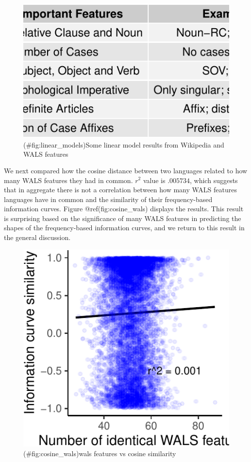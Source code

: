 \documentclass[man,floatsintext]{apa6}
\begin{document}
\begin{figure}
\centering
\includegraphics{figs/linear_models-1.pdf}
\caption{(\#fig:linear\_models)Some linear model results from Wikipedia and WALS features}
\end{figure}

We next compared how the cosine distance between two languages related to how many WALS features they had in common. \(r^2\) value is \(.005734\), which suggests that in aggregate there is not a correlation between how many WALS features languages have in common and the similarity of their frequency-based information curves. Figure @ref(fig:cosine\_wals) displays the results. This result is surprising based on the significance of many WALS features in predicting the shapes of the frequency-based information curves, and we return to this result in the general discussion.

\begin{figure}
\centering
\includegraphics{figs/cosine_wals-1.pdf}
\caption{(\#fig:cosine\_wals)wals features vs cosine similarity}
\end{figure}
\end{document}
